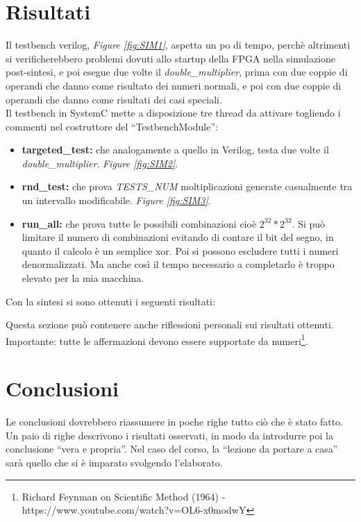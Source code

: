 \documentclass[]{IEEEtran}
\begin{document}
\section{Risultati}
Il testbench verilog, \textit{Figure \ref{fig:SIM1}}, aspetta un po di tempo, perchè altrimenti si verificherebbero problemi dovuti allo startup della FPGA nella simulazione post-sintesi, e poi esegue due volte il \textit{double\_multiplier}, prima con due coppie di operandi che danno come risultato dei numeri normali, e poi con due coppie di operandi che danno come risultati dei casi speciali. \\

Il testbench in SystemC mette a disposizione tre thread da attivare togliendo i commenti nel costruttore del ``TestbenchModule'':
\begin{itemize}
    \item \textbf{targeted\_test:} che analogamente a quello in Verilog, testa due volte il \textit{double\_multiplier}. \textit{Figure \ref{fig:SIM2}}.
    \item \textbf{rnd\_test:} che prova \textit{TESTS\_NUM} moltiplicazioni generate casualmente tra un intervallo modificabile. \textit{Figure \ref{fig:SIM3}}.
    \item \textbf{run\_all:} che prova tutte le possibili combinazioni cioè \(2^{32} * 2^{32}\). Si può limitare il numero di combinazioni evitando di contare il bit del segno, in quanto il calcolo è un semplice xor. Poi si possono escludere tutti i numeri denormalizzati. Ma anche così il tempo necessario a completarlo è troppo elevato per la mia macchina.
\end{itemize}
Con la sintesi si sono ottenuti i seguenti risultati:


















Questa sezione può contenere anche riflessioni personali sui risultati ottenuti. Importante: tutte le affermazioni devono essere supportate da numeri\footnote{Richard Feynman on Scientific Method (1964) -\\ https://www.youtube.com/watch?v=OL6-x0modwY}.

\section{Conclusioni}
Le conclusioni dovrebbero riassumere in poche righe  tutto ciò che è stato fatto. Un paio di righe descrivono i risultati osservati, in modo da introdurre poi la conclusione ``vera e propria''. Nel caso del corso, la ``lezione da portare a casa'' sarà quello che si è imparato svolgendo l'elaborato.
\end{document}
